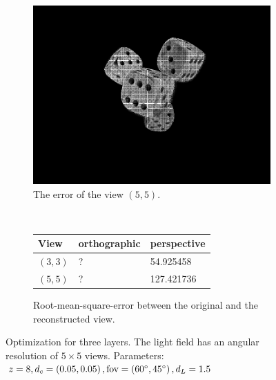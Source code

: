 \documentclass[11pt,a4paper,titlepage]{article}
\begin{document}
\begin{figure}[h]
\begin{subfigure}[t]{0.4\textwidth}
		\includegraphics[width=\textwidth]{results/dice_perspective_rec_3Layers_r=0/custom_view_error.png}
		\caption{The error of the view $\left( 5, 5 \right)$.}
	\end{subfigure}%
	\\
	\begin{subfigure}[t]{0.4\textwidth}
		\begin{tabular}{|l|l|l|}
			\hline 
			View & orthographic & perspective \\ 
			\hline 
			$\left(3, 3\right)$ & ? & 54.925458 \\ 
			\hline 
			$\left(5, 5\right)$ & ? & 127.421736 \\ 
			\hline 
		\end{tabular} 
		\caption{Root-mean-square-error between the original and the reconstructed view.}
	\end{subfigure}
	\caption{Optimization for three layers. The light field has an angular resolution of $5\times 5$ views. Parameters: $z = 8, d_c = \left( 0.05, 0.05 \right), \text{fov} = \left( 60 \degree, 45\degree \right), d_L = 1.5$}
\end{figure}
\end{document}
